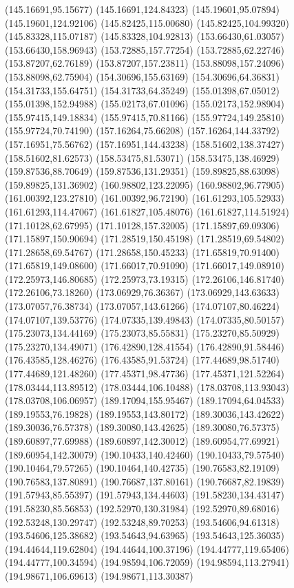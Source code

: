 {(145.16691,95.15677) (145.16691,124.84323) (145.19601,95.07894) (145.19601,124.92106) (145.82425,115.00680) (145.82425,104.99320) (145.83328,115.07187) (145.83328,104.92813)
(153.66430,61.03057) (153.66430,158.96943) (153.72885,157.77254) (153.72885,62.22746) (153.87207,62.76189) (153.87207,157.23811) (153.88098,157.24096) (153.88098,62.75904)
(154.30696,155.63169) (154.30696,64.36831) (154.31733,155.64751) (154.31733,64.35249) (155.01398,67.05012) (155.01398,152.94988) (155.02173,67.01096) (155.02173,152.98904)
(155.97415,149.18834) (155.97415,70.81166) (155.97724,149.25810) (155.97724,70.74190) (157.16264,75.66208) (157.16264,144.33792) (157.16951,75.56762) (157.16951,144.43238)
(158.51602,138.37427) (158.51602,81.62573) (158.53475,81.53071) (158.53475,138.46929) (159.87536,88.70649) (159.87536,131.29351) (159.89825,88.63098) (159.89825,131.36902)
(160.98802,123.22095) (160.98802,96.77905) (161.00392,123.27810) (161.00392,96.72190) (161.61293,105.52933) (161.61293,114.47067) (161.61827,105.48076) (161.61827,114.51924)
(171.10128,62.67995) (171.10128,157.32005) (171.15897,69.09306) (171.15897,150.90694) (171.28519,150.45198) (171.28519,69.54802) (171.28658,69.54767) (171.28658,150.45233)
(171.65819,70.91400) (171.65819,149.08600) (171.66017,70.91090) (171.66017,149.08910) (172.25973,146.80685) (172.25973,73.19315) (172.26106,146.81740) (172.26106,73.18260)
(173.06929,76.36367) (173.06929,143.63633) (173.07057,76.38734) (173.07057,143.61266) (174.07107,80.46224) (174.07107,139.53776) (174.07335,139.49843) (174.07335,80.50157)
(175.23073,134.44169) (175.23073,85.55831) (175.23270,85.50929) (175.23270,134.49071) (176.42890,128.41554) (176.42890,91.58446) (176.43585,128.46276) (176.43585,91.53724)
(177.44689,98.51740) (177.44689,121.48260) (177.45371,98.47736) (177.45371,121.52264) (178.03444,113.89512) (178.03444,106.10488) (178.03708,113.93043) (178.03708,106.06957)
(189.17094,155.95467) (189.17094,64.04533) (189.19553,76.19828) (189.19553,143.80172) (189.30036,143.42622) (189.30036,76.57378) (189.30080,143.42625) (189.30080,76.57375)
(189.60897,77.69988) (189.60897,142.30012) (189.60954,77.69921) (189.60954,142.30079) (190.10433,140.42460) (190.10433,79.57540) (190.10464,79.57265) (190.10464,140.42735)
(190.76583,82.19109) (190.76583,137.80891) (190.76687,137.80161) (190.76687,82.19839) (191.57943,85.55397) (191.57943,134.44603) (191.58230,134.43147) (191.58230,85.56853)
(192.52970,130.31984) (192.52970,89.68016) (192.53248,130.29747) (192.53248,89.70253) (193.54606,94.61318) (193.54606,125.38682) (193.54643,94.63965) (193.54643,125.36035)
(194.44644,119.62804) (194.44644,100.37196) (194.44777,119.65406) (194.44777,100.34594) (194.98594,106.72059) (194.98594,113.27941) (194.98671,106.69613) (194.98671,113.30387)
}
